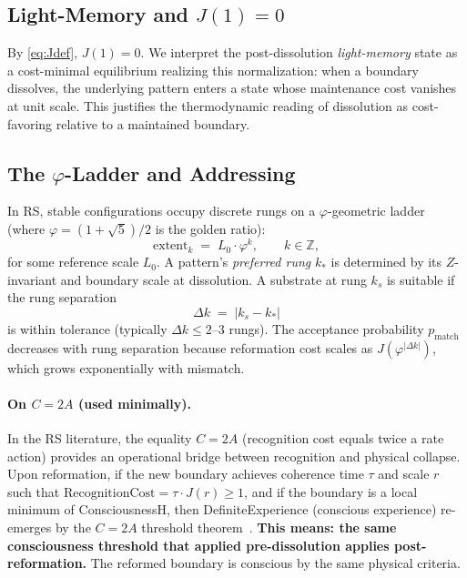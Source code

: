 \documentclass[11pt,letterpaper]{article}
\theoremstyle{definition}
\theoremstyle{remark}
\begin{document}
\subsection{Light-Memory and \texorpdfstring{\(J(1)=0\)}{J(1)=0}}

By \eqref{eq:Jdef}, \(J(1)=0\). We interpret the post-dissolution \emph{light-memory} state as a cost-minimal equilibrium realizing this normalization: when a boundary dissolves, the underlying pattern enters a state whose maintenance cost vanishes at unit scale. This justifies the thermodynamic reading of dissolution as cost-favoring relative to a maintained boundary.

\subsection{The \texorpdfstring{\(\varphi\)}{φ}-Ladder and Addressing}

In RS, stable configurations occupy discrete rungs on a \(\varphi\)-geometric ladder (where \(\varphi=(1+\sqrt{5})/2\) is the golden ratio):
\begin{equation}\label{eq:ladder}
\text{extent}_k \;=\; L_0 \cdot \varphi^k,\qquad k\in\mathbb{Z},
\end{equation}
for some reference scale \(L_0\). A pattern's \emph{preferred rung} \(k_*\) is determined by its \(Z\)-invariant and boundary scale at dissolution. A substrate at rung \(k_s\) is suitable if the rung separation
\begin{equation}\label{eq:rung_sep}
\Delta k \;=\; |k_s - k_*|
\end{equation}
is within tolerance (typically \(\Delta k \le 2\)--\(3\) rungs). The acceptance probability \(p_{\text{match}}\) decreases with rung separation because reformation cost scales as \(J(\varphi^{|\Delta k|})\), which grows exponentially with mismatch.

\paragraph{On \texorpdfstring{\(C=2A\)}{C=2A} (used minimally).}
In the RS literature, the equality \(C=2A\) (recognition cost equals twice a rate action) provides an operational bridge between recognition and physical collapse. Upon reformation, if the new boundary achieves coherence time \(\tau\) and scale \(r\) such that \(\text{RecognitionCost}=\tau\cdot J(r)\ge 1\), and if the boundary is a local minimum of ConsciousnessH, then DefiniteExperience (conscious experience) re-emerges by the \(C=2A\) threshold theorem~\cite{C2A_Bridge}. \textbf{This means: the same consciousness threshold that applied pre-dissolution applies post-reformation.} The reformed boundary is conscious by the same physical criteria.
\end{document}
